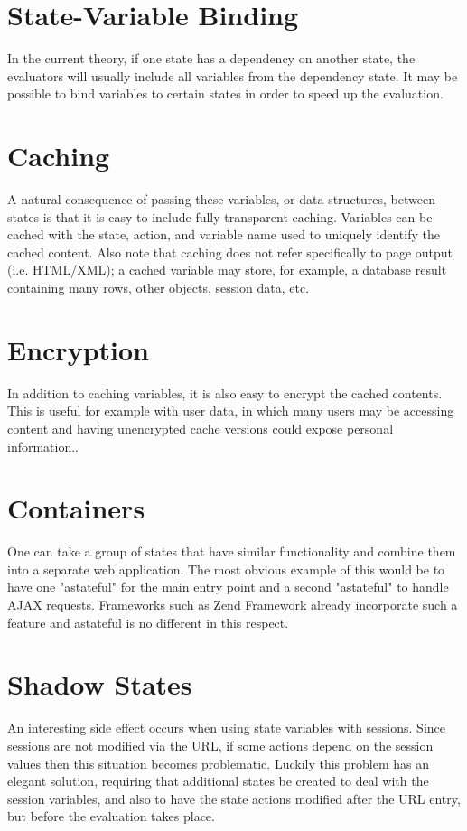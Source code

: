 \documentclass[11pt,twocolumn]{article}
\begin{document}
\section{State-Variable Binding}
In the current theory, if one state has a dependency on another state, the evaluators will usually include all variables from the dependency state. It may be possible to bind variables to certain states in order to speed up the evaluation.
\section{Caching}
A natural consequence of passing these variables, or data structures, between states is that it is easy to include fully transparent caching. Variables can be cached with the state, action, and variable name used to uniquely identify the cached content. Also note that caching does not refer specifically to page output (i.e. HTML/XML); a cached variable may store, for example, a database result containing many rows, other objects, session data, etc.
\section{Encryption}
In addition to caching variables, it is also easy to encrypt the cached contents. This is useful for example with user data, in which many users may be accessing content and having unencrypted cache versions could expose personal information..
\section{Containers}
One can take a group of states that have similar functionality and combine them into a separate web application. The most obvious example of this would be to have one "astateful" for the main entry point and a second "astateful" to handle AJAX requests. Frameworks such as Zend Framework already incorporate such a feature and astateful is no different in this respect.
\section{Shadow States}
An interesting side effect occurs when using state variables with sessions. Since sessions are not modified via the URL, if some actions depend on the session values then this situation becomes problematic. Luckily this problem has an elegant solution, requiring that additional states be created to deal with the session variables, and also to have the state actions modified after the URL entry, but before the evaluation takes place.
\end{document}
